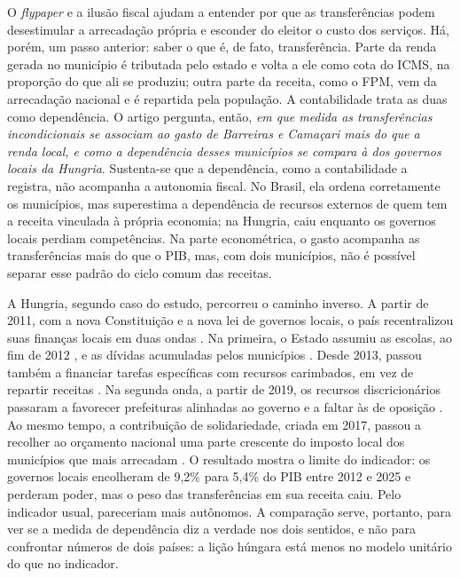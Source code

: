 O \textit{flypaper} e a ilusão fiscal ajudam a entender por que as transferências podem desestimular a arrecadação própria e esconder do eleitor o custo dos serviços. Há, porém, um passo anterior: saber o que é, de fato, transferência. Parte da renda gerada no município é tributada pelo estado e volta a ele como cota do ICMS, na proporção do que ali se produziu; outra parte da receita, como o FPM, vem da arrecadação nacional e é repartida pela população. A contabilidade trata as duas como dependência. O artigo pergunta, então, \textit{em que medida as transferências incondicionais se associam ao gasto de Barreiras e Camaçari mais do que a renda local, e como a dependência desses municípios se compara à dos governos locais da Hungria}. Sustenta-se que a dependência, como a contabilidade a registra, não acompanha a autonomia fiscal. No Brasil, ela ordena corretamente os municípios, mas superestima a dependência de recursos externos de quem tem a receita vinculada à própria economia; na Hungria, caiu enquanto os governos locais perdiam competências. Na parte econométrica, o gasto acompanha as transferências mais do que o PIB, mas, com dois municípios, não é possível separar esse padrão do ciclo comum das receitas.

A Hungria, segundo caso do estudo, percorreu o caminho inverso. A partir de 2011, com a nova Constituição e a nova lei de governos locais, o país recentralizou suas finanças locais em duas ondas \citep{Dobos2025}. Na primeira, o Estado assumiu as escolas, ao fim de 2012 \citep{Semjen2023}, e as dívidas acumuladas pelos municípios \citep{Vasvari2020571}. Desde 2013, passou também a financiar tarefas específicas com recursos carimbados, em vez de repartir receitas \citep{OCDE_UCLG2016}. Na segunda onda, a partir de 2019, os recursos discricionários passaram a favorecer prefeituras alinhadas ao governo e a faltar às de oposição \citep{Vasvari2024467, Kovarek2023}. Ao mesmo tempo, a contribuição de solidariedade, criada em 2017, passou a recolher ao orçamento nacional uma parte crescente do imposto local dos municípios que mais arrecadam \citep{CoE2024}. O resultado mostra o limite do indicador: os governos locais encolheram de 9,2\% para 5,4\% do PIB entre 2012 e 2025 e perderam poder, mas o peso das transferências em sua receita caiu. Pelo indicador usual, pareceriam mais autônomos. A comparação serve, portanto, para ver se a medida de dependência diz a verdade nos dois sentidos, e não para confrontar números de dois países: a lição húngara está menos no modelo unitário do que no indicador.

